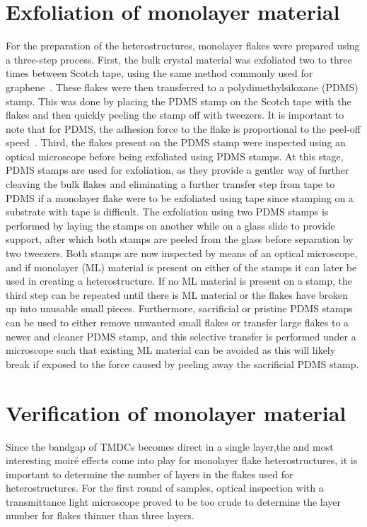 \section{Exfoliation of monolayer material}
%
For the preparation of the heterostructures, monolayer flakes were prepared using a three-step process.
%
First, the bulk crystal material was exfoliated two to three times between Scotch tape, using the same method commonly used for graphene~\cite{novoselovRoomTemperatureQuantumHall2007}. 
%
These flakes were then transferred to a polydimethylsiloxane (PDMS) stamp.
%
This was done by placing the PDMS stamp on the Scotch tape with the flakes and then quickly peeling the stamp off with tweezers. 
%
It is important to note that for PDMS, the adhesion force to the flake is proportional to the peel-off speed~\cite{kusakaMicrocontactPatterningConductive2015}.
%
Third, the flakes present on the PDMS stamp were inspected using an optical microscope before being exfoliated using PDMS stamps. At this stage, PDMS stamps are used for exfoliation, as they provide a gentler way of further cleaving the bulk flakes and eliminating a further transfer step from tape to PDMS if a monolayer flake were to be exfoliated using tape since stamping on a substrate with tape is difficult. The exfoliation using two PDMS stamps is performed by laying the stamps on another while on a glass slide to provide support, after which both stamps are peeled from the glass before separation by two tweezers. Both stamps are now inspected by means of an optical microscope, and if monolayer (ML) material is present on either of the stamps it can later be used in creating a heterostructure.
If no ML material is present on a stamp, the third step can be repeated until there is ML material or the flakes have broken up into unusable small pieces.
Furthermore, sacrificial or pristine PDMS stamps can be used to either remove unwanted small flakes or transfer large flakes to a newer and cleaner PDMS stamp, and this selective transfer is performed under a microscope such that existing ML material can be avoided as this will likely break if exposed to the force caused by peeling away the sacrificial PDMS stamp.

\section{Verification of monolayer material}

Since the bandgap of TMDCs becomes direct in a single layer,the  and most interesting moiré effects come into play for monolayer flake heterostructures, it is important to determine the number of layers in the flakes used for heterostructures. 
For the first round of samples, optical inspection with a transmittance light microscope proved to be too crude to determine the layer number for flakes thinner than three layers.

